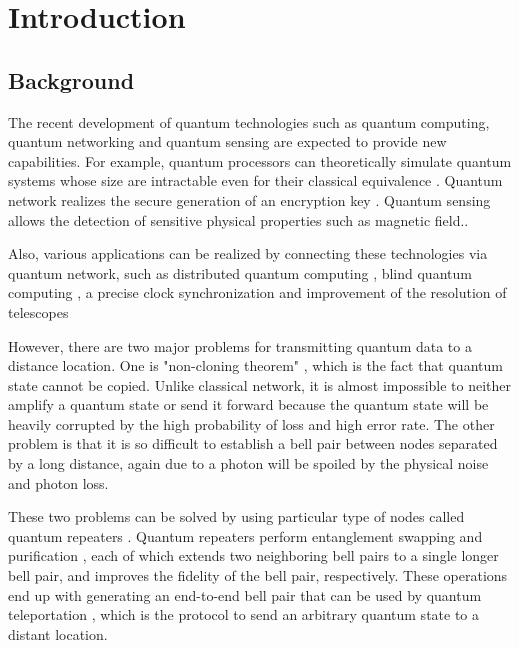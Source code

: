 \chapter{Introduction}
\label{introduction}

\section{Background}
\label{introduction:background} 

The recent development of quantum technologies such as quantum computing, quantum networking and quantum sensing are expected to provide new capabilities. 
For example, quantum processors can theoretically simulate quantum systems whose size are intractable even for their classical equivalence \cite{feynman1982simulating}.
Quantum network realizes the secure generation of an encryption key \cite{Bennett_2014} \cite{PhysRevLett.67.661}.
Quantum sensing allows the detection of sensitive physical properties such as magnetic field.\cite{pmid:12686995}.

Also, various applications can be realized by connecting these technologies via quantum network, such as distributed quantum computing \cite{Meter2016ThePT}, blind quantum computing \cite{arrighi2006blind}, a precise clock synchronization \cite{jozsa2000quantum} and improvement of the resolution of telescopes \cite{PhysRevLett.123.070504}

However, there are two major problems for transmitting quantum data to a distance location.
One is "non-cloning theorem" \cite{wootters1982single}, which is the fact that quantum state cannot be copied. Unlike classical network, it is almost impossible to neither amplify a quantum state or send it forward because the quantum state will be heavily corrupted by the high probability of loss and high error rate.
The other problem is that it is so difficult to establish a bell pair between nodes separated by a long distance, again due to a photon will be spoiled by the physical noise and photon loss.

These two problems can be solved by using particular type of nodes called quantum repeaters \cite{PhysRevLett.81.5932}. Quantum repeaters perform entanglement swapping \cite{PhysRevLett.71.4287} and purification \cite{PhysRevA.53.2046}, each of which extends two neighboring bell pairs to a single longer bell pair, and improves the fidelity of the bell pair, respectively.
These operations end up with generating an end-to-end bell pair that can be used by quantum teleportation \cite{PhysRevLett.70.1895}, which is the protocol to send an arbitrary quantum state to a distant location. 

